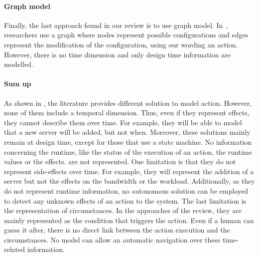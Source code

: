 	
\paragraph{Graph model}
Finally, the last approach found in our review is to use graph model.
In~\cite{DBLP:journals/computer/GeorgasHT09}, researchers use a graph where nodes represent possible configurations and edges represent the modification of the configuration, using our wording an \gls{action}.
However, there is no time dimension and only design time information are modelled.

\paragraph{Sum up}
As shown in , the literature provides different solution to model \gls{action}.
However, none of them include a temporal dimension.
Thus, even if they represent effects, they cannot describe them over time.
For example, they will be able to model that a new server will be added, but not when.
Moreover, these solutions mainly remain at design time, except for those that use a state machine.
No information concerning the runtime, like the status of the execution of an action, the runtime values or the effects. are not represented.
One limitation is that they do not represent side-effects over time.
For example, they will represent the addition of a server but not the effects on the bandwidth or the workload.
Additionally, as they do not represent runtime information, no autonomous solution can be employed to detect any unknown effects of an action to the system.
The last limitation is the representation of \glspl{circumstance}.
In the approaches of the review, they are mainly represented as the condition that triggers the action.
Even if a human can guess it after, there is no direct link between the action execution and the circumstances.
No model can allow an automatic navigation over these time-related information. 


